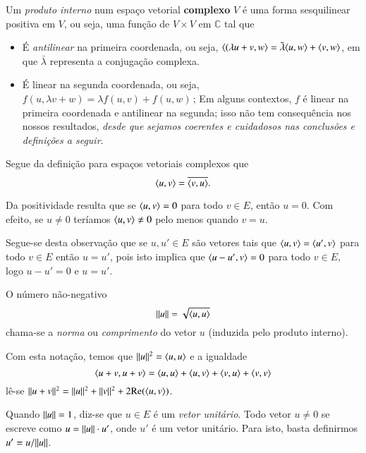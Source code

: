 \begin{defi}
  Um \emph{produto interno} num espaço vetorial \textbf{complexo} $V$ é uma forma sesquilinear positiva em $V$, ou seja, uma função de $V \times V$ em $\mathbb{C}$ tal que
\begin{itemize}
\item É \emph{antilinear} na primeira coordenada, ou seja, $\langle (\lambda u + v, w \rangle = \bar{\lambda} \langle u, w \rangle + \langle v, w \rangle$, em que $\bar{\lambda}$ representa a conjugação complexa.
\item É linear na segunda coordenada, ou seja, $f(u, \lambda v + w) = \lambda f(u, v) + f(u, w)\,$;
Em alguns contextos, $f$ é linear na primeira coordenada e antilinear na segunda; isso não tem consequência nos nossos resultados, \emph{desde que sejamos coerentes e cuidadosos nas conclusões e definições a seguir}. 
\end{itemize}
\end{defi}

Segue da definição para espaços vetoriais complexos que 
\begin{equation*}
	\langle u, v \rangle = \overline{\langle v, u \rangle}.
\end{equation*}

Da positividade resulta que se $\langle u, v \rangle=0$ para todo $v\in E$, então $u=0$. Com efeito, se $u\ne 0$ teríamos $\langle u, v \rangle \ne 0$ pelo menos quando $v=u$.

Segue-se desta observação que se $u,u'\in E$ são vetores tais que $\langle u, v \rangle=\langle u', v \rangle$ para todo $v\in E$ então $u=u'$, pois isto implica que $\langle u-u', v \rangle = 0$ para todo $v\in E$, logo $u-u'=0$ e $u=u'$.

\begin{defi}
O número não-negativo 
\begin{equation*}
	\| u \|=\sqrt{\langle u, u \rangle}
\end{equation*} 
chama-se a \emph{norma} ou \emph{comprimento} do vetor $u$ (induzida pelo produto interno). 
\end{defi}

Com esta notação, temos que $\| u \|^2 = \langle u, u \rangle$ e a igualdade
\begin{equation*}
  \langle u+v, u+v \rangle = \langle u, u \rangle + \langle u, v \rangle + \langle v, u \rangle + \langle v, v \rangle
\end{equation*}
lê-se $\| u+v \|^2 = \| u \|^2+\| v \|^2+2\text{Re}(\langle u, v \rangle)$.

Quando $\| u \|=1$, diz-se que $u\in E$ é um \emph{vetor unitário}. Todo vetor $u\ne 0$ se escreve como $u=\| u \|\cdot u'$, onde $u'$ é um vetor unitário. Para isto, basta definirmos $u'=u/\| u \|$.

